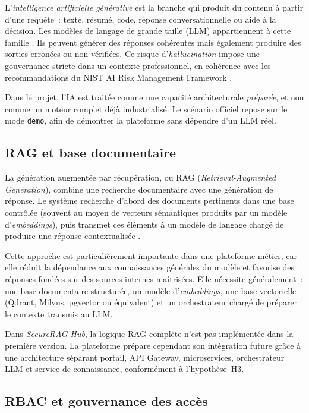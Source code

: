 L'\textit{intelligence artificielle générative} est la branche qui produit du contenu à partir d'une requête~: texte, résumé, code, réponse conversationnelle ou aide à la décision. Les modèles de langage de grande taille (LLM) appartiennent à cette famille \cite{vaswani_transformer_2017,bommasani_foundation_models}. Ils peuvent générer des réponses cohérentes mais également produire des sorties erronées ou non vérifiées. Ce risque d'\textit{hallucination} \cite{ji_hallucination_survey} impose une gouvernance stricte dans un contexte professionnel, en cohérence avec les recommandations du NIST AI Risk Management Framework \cite{nist_ai_rmf_2023}.

Dans le projet, l'IA est traitée comme une capacité architecturale \textit{préparée}, et non comme un moteur complet déjà industrialisé. Le scénario officiel repose sur le mode \texttt{demo}, afin de démontrer la plateforme sans dépendre d'un LLM réel.

\subsection{RAG et base documentaire}

La génération augmentée par récupération, ou RAG (\textit{Retrieval-Augmented Generation}), combine une recherche documentaire avec une génération de réponse. Le système recherche d'abord des documents pertinents dans une base contrôlée (souvent au moyen de vecteurs sémantiques produits par un modèle d'\textit{embeddings}), puis transmet ces éléments à un modèle de langage chargé de produire une réponse contextualisée \cite{lewis_rag_2020,karpukhin_dpr_2020,gao_rag_survey_2024}.

Cette approche est particulièrement importante dans une plateforme métier, car elle réduit la dépendance aux connaissances générales du modèle et favorise des réponses fondées sur des sources internes maîtrisées. Elle nécessite généralement~: une base documentaire structurée, un modèle d'\textit{embeddings}, une base vectorielle (Qdrant, Milvus, pgvector ou équivalent) et un orchestrateur chargé de préparer le contexte transmis au LLM.

Dans \textit{SecureRAG Hub}, la logique RAG complète n'est pas implémentée dans la première version. La plateforme prépare cependant son intégration future grâce à une architecture séparant portail, API Gateway, microservices, orchestrateur LLM et service de connaissance, conformément à l'hypothèse~H3.

\subsection{RBAC et gouvernance des accès}

